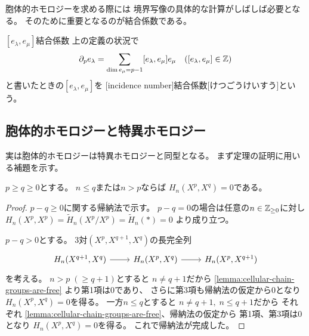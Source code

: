 \documentclass[report]{jlreq}
\begin{document}
胞体的ホモロジーを求める際には
境界写像の具体的な計算がしばしば必要となる。
そのために重要となるのが結合係数である。

\begin{definition}[結合係数]
        {$[e_\lambda, e_\mu]$}{結合係数}
    上の定義の状況で
    \begin{equation}
        \partial_p e_\lambda
            = \sum_{\dim e_\mu = p - 1} [e_\lambda, e_\mu] e_\mu
            \quad
            ([e_\lambda, e_\mu] \in \mathbb{Z})
    \end{equation}
    と書いたときの$[e_\lambda, e_\mu]$を
    [incidence number]{結合係数}[けつごうけいすう]という。
\end{definition}



\subsection{胞体的ホモロジーと特異ホモロジー}

実は胞体的ホモロジーは特異ホモロジーと同型となる。
まず定理の証明に用いる補題を示す。

\begin{lemma}
    $p \ge q \ge 0$とする。
    $n \le q$または$n > p$ならば
    $H_n(X^p, X^q) = 0$である。
    \TODO{}
\end{lemma}

\begin{proof}
    $p - q \ge 0$に関する帰納法で示す。
    $p - q = 0$の場合は任意の$n \in \mathbb{Z}_{\ge 0}$に対し
    $H_n(X^p, X^p) = \widetilde{H}_n(X^p / X^p) = \widetilde{H}_n(*) = 0$
    より成り立つ。

    $p - q > 0$とする。
    3対$(X^p, X^{q + 1}, X^q)$の長完全列
    \begin{equation}
        \begin{tikzcd}
            H_n(X^{q + 1}, X^q) \ar{r}
                & H_n(X^p, X^q) \ar{r}
                & H_n(X^p, X^{q + 1})
        \end{tikzcd}
    \end{equation}
    を考える。
    $n > p \; (\ge q + 1)$とすると
    $n \neq q + 1$だから
    \cref{lemma:cellular-chain-groups-are-free}
    より第1項は$0$であり、
    さらに第3項も帰納法の仮定から$0$となり
    $H_n(X^p, X^q) = 0$を得る。
    一方$n \le q$とすると
    $n \neq q + 1, \; n \le q + 1$だから
    それぞれ
    \cref{lemma:cellular-chain-groups-are-free}、帰納法の仮定から
    第1項、第3項は$0$となり
    $H_n(X^p, X^q) = 0$を得る。
    これで帰納法が完成した。
\end{proof}
\end{document}
